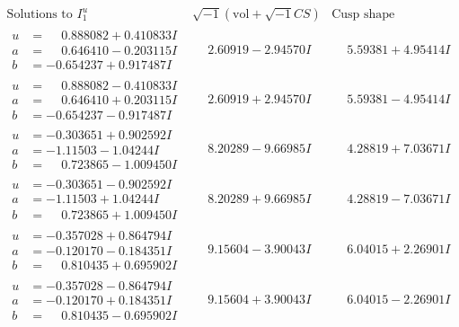 \documentclass[1p]{elsarticle_modified}
\theoremstyle{definition}
\newcommand{\I}{\sqrt{-1}}
\begin{document}
$$\begin{array}{c|c|c}  
\text{Solutions to }I^u_{1}& \I (\text{vol} + \sqrt{-1}CS) & \text{Cusp shape}\\
 \hline 
\begin{aligned}
u &= \phantom{-}0.888082 + 0.410833 I \\
a &= \phantom{-}0.646410 - 0.203115 I \\
b &= -0.654237 + 0.917487 I\end{aligned}
 & \phantom{-}2.60919 - 2.94570 I & \phantom{-}5.59381 + 4.95414 I \\ \hline\begin{aligned}
u &= \phantom{-}0.888082 - 0.410833 I \\
a &= \phantom{-}0.646410 + 0.203115 I \\
b &= -0.654237 - 0.917487 I\end{aligned}
 & \phantom{-}2.60919 + 2.94570 I & \phantom{-}5.59381 - 4.95414 I \\ \hline\begin{aligned}
u &= -0.303651 + 0.902592 I \\
a &= -1.11503 - 1.04244 I \\
b &= \phantom{-}0.723865 - 1.009450 I\end{aligned}
 & \phantom{-}8.20289 - 9.66985 I & \phantom{-}4.28819 + 7.03671 I \\ \hline\begin{aligned}
u &= -0.303651 - 0.902592 I \\
a &= -1.11503 + 1.04244 I \\
b &= \phantom{-}0.723865 + 1.009450 I\end{aligned}
 & \phantom{-}8.20289 + 9.66985 I & \phantom{-}4.28819 - 7.03671 I \\ \hline\begin{aligned}
u &= -0.357028 + 0.864794 I \\
a &= -0.120170 - 0.184351 I \\
b &= \phantom{-}0.810435 + 0.695902 I\end{aligned}
 & \phantom{-}9.15604 - 3.90043 I & \phantom{-}6.04015 + 2.26901 I \\ \hline\begin{aligned}
u &= -0.357028 - 0.864794 I \\
a &= -0.120170 + 0.184351 I \\
b &= \phantom{-}0.810435 - 0.695902 I\end{aligned}
 & \phantom{-}9.15604 + 3.90043 I & \phantom{-}6.04015 - 2.26901 I \\ \hline\begin{aligned}

\end{aligned}
\end{array}$$
\end{document}
